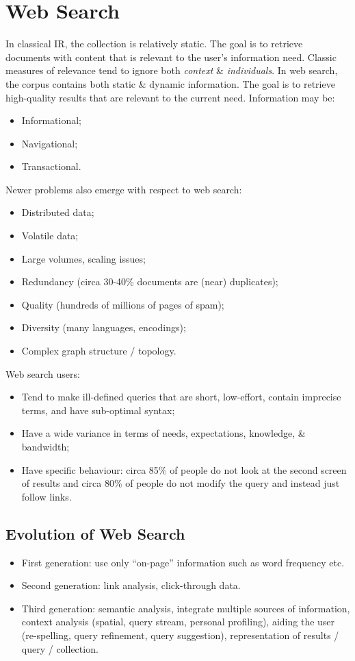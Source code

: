 \documentclass[a4paper,11pt]{article}
\begin{document}
\section{Web Search}
In classical IR, the collection is relatively static.
The goal is to retrieve documents with content that is relevant to the user's information need.
Classic measures of relevance tend to ignore both \textit{context} \& \textit{individuals}.
In web search, the corpus contains both static \& dynamic information.
The goal is to retrieve high-quality results that are relevant to the current need.
Information may be:
\begin{itemize}
    \item   Informational;
    \item   Navigational; 
    \item   Transactional.
\end{itemize}

Newer problems also emerge with respect to web search:
\begin{itemize}
    \item   Distributed data;
    \item   Volatile data;
    \item   Large volumes, scaling issues;
    \item   Redundancy (circa 30-40\% documents are (near) duplicates);
    \item   Quality (hundreds of millions of pages of spam);
    \item   Diversity (many languages, encodings);
    \item   Complex graph structure / topology.
\end{itemize}

Web search users:
\begin{itemize}
    \item   Tend to make ill-defined queries that are short, low-effort, contain imprecise terms, and have sub-optimal syntax;
    \item   Have a wide variance in terms of needs, expectations, knowledge, \& bandwidth;
    \item   Have specific behaviour: circa 85\% of people do not look at the second screen of results and circa 80\% of people do not modify the query and instead just follow links.
\end{itemize}

\subsection{Evolution of Web Search}
\begin{itemize}
    \item   First generation: use only ``on-page'' information such as word frequency etc.
    \item   Second generation: link analysis, click-through data.
    \item   Third generation: semantic analysis, integrate multiple sources of information, context analysis (spatial, query stream, personal profiling), aiding the user (re-spelling, query refinement, query suggestion), representation of results / query / collection.
\end{itemize}
\end{document}
